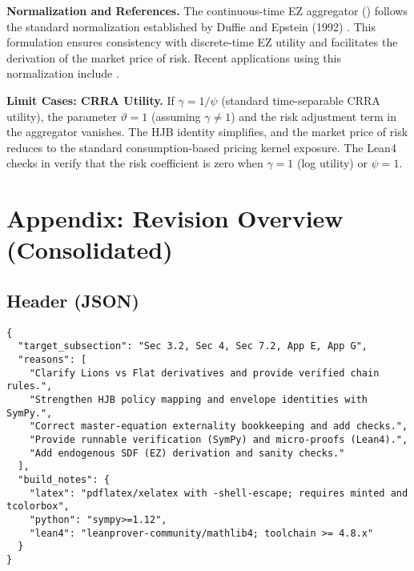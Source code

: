 ﻿\documentclass[11pt,letterpaper,oneside]{article}
\numberwithin{equation}{section}
\newcommand{\1}{\mathbf{1}}
\begin{document}
\begin{tcolorbox}[literaturestyle]
\textbf{Normalization and References.}
The continuous-time EZ aggregator () follows the standard normalization established by Duffie and Epstein (1992) \cite{duffie_epstein_1992}. This formulation ensures consistency with discrete-time EZ utility and facilitates the derivation of the market price of risk. Recent applications using this normalization include \cite{Sauzet2023}.
\end{tcolorbox}

\begin{tcolorbox}[mathstyle]
\textbf{Limit Cases: CRRA Utility.}
If $\gamma = 1/\psi$ (standard time-separable CRRA utility), the parameter $\vartheta=1$ (assuming $\gamma\neq 1$) and the risk adjustment term in the aggregator vanishes. The HJB identity simplifies, and the market price of risk reduces to the standard consumption-based pricing kernel exposure. The Lean4 checks in  verify that the risk coefficient is zero when $\gamma=1$ (log utility) or $\psi=1$.
\end{tcolorbox}

\section*{Appendix: Revision Overview (Consolidated)}

\subsection*{Header (JSON)}
\begin{tcolorbox}[sympycheckstyle,title={Editorial Header (JSON)}]
\begin{Verbatim}[fontsize=\small]
{
  "target_subsection": "Sec 3.2, Sec 4, Sec 7.2, App E, App G",
  "reasons": [
    "Clarify Lions vs Flat derivatives and provide verified chain rules.",
    "Strengthen HJB policy mapping and envelope identities with SymPy.",
    "Correct master-equation externality bookkeeping and add checks.",
    "Provide runnable verification (SymPy) and micro-proofs (Lean4).",
    "Add endogenous SDF (EZ) derivation and sanity checks."
  ],
  "build_notes": {
    "latex": "pdflatex/xelatex with -shell-escape; requires minted and tcolorbox",
    "python": "sympy>=1.12",
    "lean4": "leanprover-community/mathlib4; toolchain >= 4.8.x"
  }
}
\end{Verbatim}
\end{tcolorbox}
\end{document}
